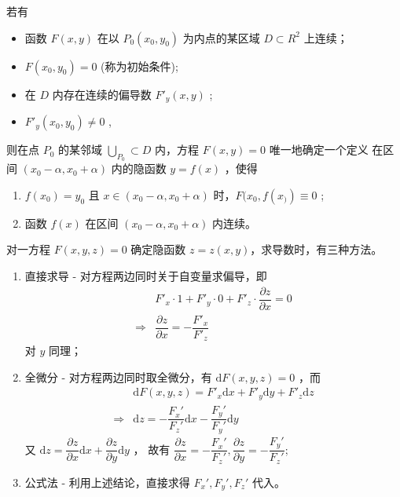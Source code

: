 \begin{Theo}[隐函数存在定理]

    若有
    \begin{itemize}
        \item 函数 $ F(x,y) $ 在以 $ P_0(x_0,y_0) $ 为内点的某区域 $ D\subset R^2 $ 上连续；
        \item $ F(x_0,y_0) = 0 $ (称为初始条件);
        \item 在 $ D $ 内存在连续的偏导数 $ F'_y(x,y) $ ;
        \item $ F'_y(x_0,y_0)\neq0 $ ,
    \end{itemize}
    则在点 $ P_0 $ 的某邻域 $ \bigcup_{P_0}\subset D $ 内，方程 $ F(x,y)=0 $ 唯一地确定一个定义
    在区间 $ (x_0-\alpha,x_0+\alpha) $ 内的隐函数 $ y = f(x) $ ，使得
    \begin{enumerate}
        \item $ f(x_0) = y_0 $ 且 $ x\in (x_0-\alpha,x_0+\alpha) $ 时，$ F(x_0,f(x_)) \equiv 0 $ ;
        \item 函数 $ f(x) $ 在区间 $ (x_0-\alpha,x_0+\alpha) $ 内连续。
    \end{enumerate}
\end{Theo}

对一方程 $ F(x,y,z) = 0 $ 确定隐函数 $ z = z(x,y) $，求导数时，有三种方法。

\begin{enumerate}
    \item 直接求导 - 对方程两边同时关于自变量求偏导，即\begin{equation*}
        \begin{aligned}
            &F'_x \cdot 1 + F'_y \cdot 0 + F'_z \cdot \dfrac{\partial z}{\partial x} = 0\\
            \Rightarrow & \dfrac{\partial z}{\partial x} = -\dfrac{F'_x}{F'_z}
        \end{aligned}
    \end{equation*}
    对 $ y $ 同理；
    \item 全微分 - 对方程两边同时取全微分，有 $ \mathrm{d}F(x,y,z) = 0 $ ，而\begin{equation*}
        \begin{aligned}
            &\mathrm{d}F(x,y,z) = F'_x \mathrm{d}x + F'_y \mathrm{d}y + F'_z\mathrm{d}z\\ 
            \Rightarrow & \mathrm{d}z = -\dfrac{F_x'}{F_z'}\mathrm{d}x - \dfrac{F_y'}{F_y'}\mathrm{d}y
        \end{aligned}
    \end{equation*}
    又 $ \mathrm{d}z = \dfrac{\partial z}{\partial x}\mathrm{d}x + \dfrac{\partial z}{\partial y}\mathrm{d}y $ ，
    故有 $ \dfrac{\partial z}{\partial x} = -\dfrac{F_x'}{F_z'},
    \dfrac{\partial z}{\partial y} = -\dfrac{F_y'}{F_z'}$;
    \item 公式法 - 利用上述结论，直接求得 $ F_x',F_y',F_z' $ 代入。
\end{enumerate}

